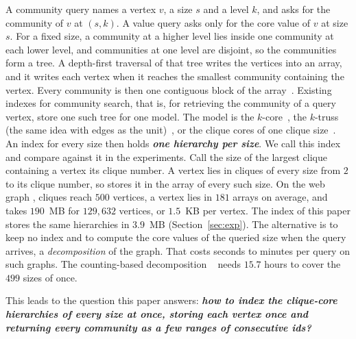 A community query names a vertex $v$, a size $s$ and a level $k$, and asks for the community of $v$ at $(s,k)$.
%
A value query asks only for the core value of $v$ at size $s$.
%
For a fixed size, a community at a higher level lies inside one community at each lower level, and communities at one level are disjoint, so the communities form a tree.
%
A depth-first traversal of that tree writes the vertices into an array, and it writes each vertex when it reaches the smallest community containing the vertex.
%
Every community is then one contiguous block of the array~\cite{fastHierarchy,Fang2016CLtree}.
%
Existing indexes for community search, that is, for retrieving the community of a query vertex, store one such tree for one model.
%
The model is the $k$-core~\cite{Barbieri2015ShellStruct,Fang2016CLtree}, the $k$-truss (the same idea with edges as the unit)~\cite{huang2014truss,akbas2017truss}, or the clique cores of one clique size~\cite{fastHierarchy}.
%
An index for every size then holds \textbf{\textit{one hierarchy per size}}.
%
We call this index \strees and compare against it in the experiments.
%
Call the size of the largest clique containing a vertex its clique number.
%
A vertex lies in cliques of every size from $2$ to its clique number, so \strees stores it in the array of every such size.
%
On the web graph \webuk, cliques reach $500$ vertices, a vertex lies in $181$ arrays on average, and \strees takes $190$~MB for $129{,}632$ vertices, or $1.5$~KB per vertex.
%
The index of this paper stores the same hierarchies in $3.9$~MB (Section~\ref{sec:exp}).
%
The alternative is to keep no index and to compute the core values of the queried size when the query arrives, a \emph{decomposition} of the graph.
%
That costs seconds to minutes per query on such graphs.
%
The counting-based decomposition \cnd~\cite{Zhang2026NucleusCounting} needs $15.7$ hours to cover the $499$ sizes of \webuk once.

This leads to the question this paper answers: \textbf{\textit{how to index the clique-core hierarchies of every size at once, storing each vertex once and returning every community as a few ranges of consecutive ids?}}

